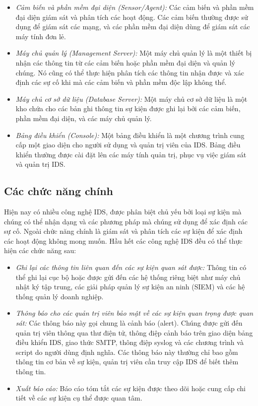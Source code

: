 \begin{itemize}
\item \emph{Cảm biến và phần mềm đại diện (Sensor/Agent):} \tab Các cảm biến và phần mềm đại diện giám sát và phân tích các hoạt động. Các cảm biến thường được sử dụng để giám sát các mạng, và các phần mềm đại diện dùng để giám sát các máy tính đơn lẻ.

\item \emph{Máy chủ quản lý (Management Server):} \tab Một máy chủ quản lý là một thiết bị nhận các thông tin từ các cảm biến hoặc phần mềm đại diện và quản lý chúng. Nó cũng có thể thực hiện phân tích các thông tin nhận được và xác định các sự cố khi mà các cảm biến và phần mềm độc lập không thể.

\item \emph{Máy chủ cơ sở dữ liệu (Database Server):} \tab Một máy chủ cơ sở dữ liệu là một kho chứa cho các bản ghi thông tin sự kiện được ghi lại bởi các cảm biến, phần mềm đại diện, và các máy chủ quản lý.

\item \emph{Bảng điều khiển (Console):}  Một bảng điều khiển là một chương trình cung cấp một giao diện cho người sử dụng và quản trị viên của IDS. Bảng điều khiển thường được cài đặt lên các máy tính quản trị, phục vụ việc giám sát và quản trị IDS.
\end{itemize}

\subsection{Các chức năng chính}
Hiện nay có nhiều công nghệ IDS, được phân biệt chủ yếu bởi loại sự kiện mà chúng có thể nhận dạng và các phương pháp mà chúng sử dụng để xác định các sự cố. Ngoài chức năng chính là giám sát và phân tích các sự kiện để xác định các hoạt động không mong muốn. Hầu hết các công nghệ IDS đều có thể thực hiện các chức năng sau:

\begin{itemize}
\item \emph{Ghi lại các thông tin liên quan đến các sự kiện quan sát được:} \tab Thông tin có thể ghi lại cục bộ hoặc được gửi đến các hệ thống riêng biệt như máy chủ nhật ký tập trung, các giải pháp quản lý sự kiện an ninh (SIEM) và các hệ thống quản lý doanh nghiệp.

\item \emph{Thông báo cho các quản trị viên bảo mật về các sự kiện quan trọng được quan sát:} \tab Các thông báo này gọi chung là cảnh báo (alert). Chúng được gửi đến quản trị viên thông qua thư điện tử, thông điệp cảnh báo trên giao diện bảng điều khiển IDS, giao thức SMTP, thông điệp syslog và các chương trình và script do người dùng định nghĩa. Các thông báo này thường chỉ bao gồm thông tin cơ bản về sự kiện, quản trị viên cần truy cập IDS để biết thêm thông tin.

\item \emph{Xuất báo cáo:} \tab Báo cáo tóm tắt các sự kiện được theo dõi hoặc cung cấp chi tiết về các sự kiện cụ thể được quan tâm.
\end{itemize}

